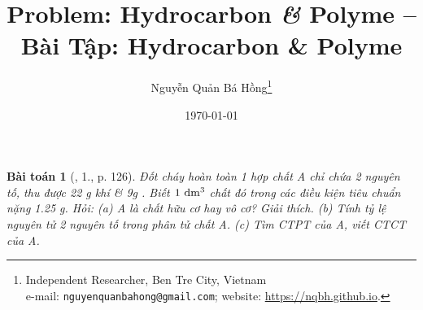 \documentclass{article}
\title{Problem: Hydrocarbon {\it\&} Polyme -- Bài Tập: Hydrocarbon \& Polyme}
\author{Nguyễn Quản Bá Hồng\footnote{Independent Researcher, Ben Tre City, Vietnam\\e-mail: \texttt{nguyenquanbahong@gmail.com}; website: \url{https://nqbh.github.io}.}}
\date{\today}
\newtheorem{baitoan}{Bài toán}
\begin{document}
\maketitle
\begin{abstract}
	
\end{abstract}
\setcounter{secnumdepth}{4}
\setcounter{tocdepth}{3}
\tableofcontents


\begin{baitoan}[\cite{An_Hoa_Hoc_nang_cao_8_9}, 1., p. 126]
	Đốt cháy hoàn toàn 1 hợp chất A chỉ chứa 2 nguyên tố, thu được {\rm22 g} khí {\rm{}} \& {\rm9g }. Biết $\rm1\ dm^3$ chất đó trong các điều kiện tiêu chuẩn nặng {\rm1.25 g}. Hỏi: (a) A là chất hữu cơ hay vô cơ? Giải thích. (b) Tính tỷ lệ nguyên tử 2 nguyên tố trong phân tử chất A. (c) Tìm {\rm CTPT} của A, viết {\rm CTCT} của A.
\end{baitoan}


\printbibliography[heading=bibintoc]
\end{document}
